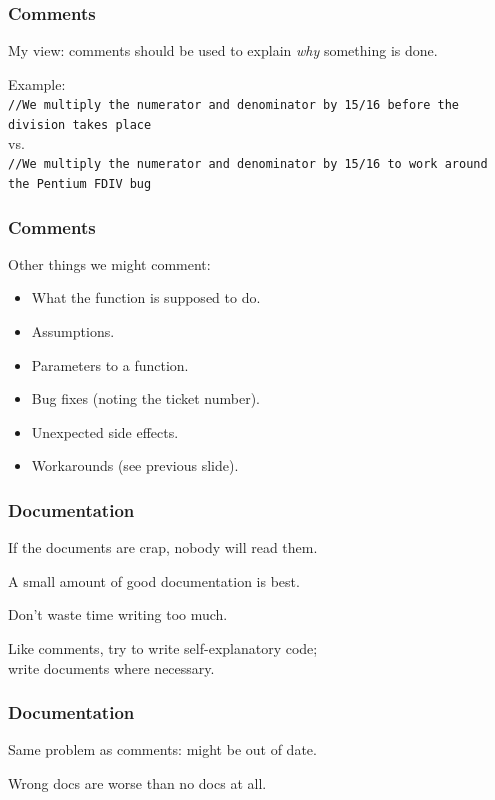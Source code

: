 \begin{frame}
\frametitle{Comments}
\begin{changemargin}{1cm}
My view: comments should be used to explain \emph{why} something is done.

Example:\\
\texttt{//We multiply the numerator and denominator by 15/16 before the division takes place}\\
vs.\\
\texttt{//We multiply the numerator and denominator by 15/16 to work around the Pentium FDIV bug}\\


\end{changemargin}
\end{frame}

\begin{frame}
\frametitle{Comments}
\begin{changemargin}{1cm}
Other things we might comment:

\begin{itemize}
	\item What the function is supposed to do.
	\item Assumptions.
	\item Parameters to a function.
	\item Bug fixes (noting the ticket number).
	\item Unexpected side effects.
	\item Workarounds (see previous slide).
\end{itemize}


\end{changemargin}
\end{frame}


\begin{frame}
\frametitle{Documentation}
\begin{changemargin}{1cm}
If the documents are crap, nobody will read them.

A small amount of good documentation is best.

Don't waste time writing too much.

Like comments, try to write self-explanatory code;\\
\quad write documents where necessary.

\end{changemargin}
\end{frame}

\begin{frame}
\frametitle{Documentation}
\begin{changemargin}{1cm}
Same problem as comments: might be out of date.

Wrong docs are worse than no docs at all.
\end{changemargin}
\end{frame}

